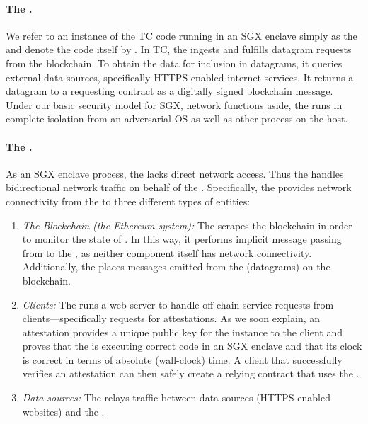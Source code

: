 \paragraph{The \encname.}
We refer to an instance of the TC code running in an SGX enclave simply as the \encname and denote the code itself by  \engine. In TC, the \encname ingests and fulfills datagram requests from the blockchain. To obtain the data for inclusion in datagrams, it queries external data sources, specifically HTTPS-enabled internet services. It returns a datagram to a requesting contract \reqcont as a digitally signed blockchain message. Under our basic security model for SGX, network functions aside, the \encname runs in complete isolation from an adversarial OS as well as other process on the host. 

\paragraph{The \medname \relay.} As an SGX enclave process, the \encname lacks direct network access. Thus the \medname handles bidirectional network traffic on behalf of the \encname. Specifically, the \medname provides network connectivity from the \encname to three different types of entities: 

\begin{enumerate}
\setlength{\itemsep}{2pt}
\setlength{\parskip}{0pt}
\setlength{\parsep}{0pt}
\item {\em The Blockchain (the Ethereum system):}  The \medname scrapes the blockchain in order to monitor the state of \tcont. In this way, it performs implicit message passing from \tcont to the \encname, as neither component itself has network connectivity. Additionally, the \medname places messages emitted from the \encname (datagrams) on the blockchain.
\item {\em Clients:} The \medname runs a web server to handle off-chain service requests from clients---specifically requests for \encname attestations. As we soon explain, an attestation provides a unique public key for the \encname instance to the  client and proves that the \encname is executing correct code in an SGX enclave and that its clock is correct in terms of absolute (wall-clock) time. A client that successfully verifies an attestation can then safely create a relying contract \reqcont that uses the \tc.
\item {\em Data sources:} The \medname relays traffic between data sources (HTTPS-enabled websites) and the \encname.
\end{enumerate}

